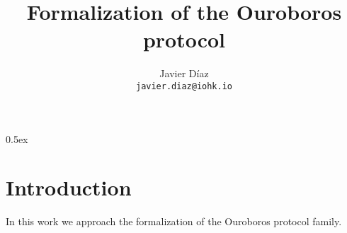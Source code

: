 \documentclass[a4paper,11pt]{article}
\begin{document}
\title{Formalization of the Ouroboros protocol}
\author{Javier D\'iaz\\\small\texttt{javier.diaz@iohk.io}}

\maketitle

\tableofcontents

\parindent 0pt\parskip 0.5ex

\section{Introduction}

In this work we approach the formalization of the Ouroboros protocol family.


\end{document}
